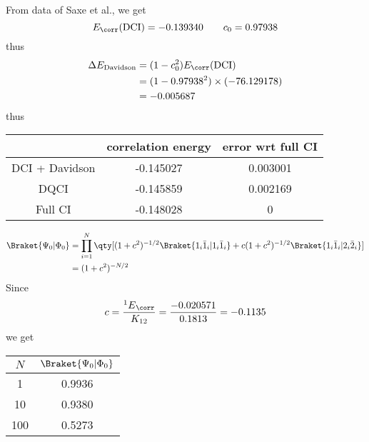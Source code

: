 \documentclass[a4paper]{article}
\begin{document}
\newpage
{}
From data of Saxe et al., we get
\begin{equation}\label{key}
E_{\corr}(\text{DCI}) = -0.139340 \qquad c_0 = 0.97938
\end{equation}
thus
\begin{align}
\Delta E_{\text{Davidson}} &= (1 - c_0^2)E_{\corr}(\text{DCI}) \notag\\
&= (1 - 0.97938^2)\times(-76.129178) \notag\\
&= -0.005687
\end{align}
thus
\begin{table}[H]
	\begin{tabular}{ccc}
		\hline
		& correlation energy & error wrt full CI \\ \hline
		DCI + Davidson & -0.145027 & 0.003001\\
		DQCI           & -0.145859 & 0.002169\\
		Full CI        & -0.148028 & 0\\ \hline
	\end{tabular}
\end{table}

\begin{align}
\Braket{\Psi_0 | \Phi_0} &= \prod_{i=1}^N \qty[(1+c^2)^{-1/2}\Braket{1_i\bar{1}_i|1_i\bar{1}_i} + c(1+c^2)^{-1/2}\Braket{1_i\bar{1}_i|2_i\bar{2}_i}] \notag\\
&= (1+c^2)^{-N/2}
\end{align}
Since 
\begin{equation}\label{key}
c = \dfrac{{^1 E}_{\corr}}{K_{12}} = \dfrac{-0.020571}{0.1813} = -0.1135
\end{equation}
we get
\begin{table}[H]
	\begin{tabular}{cc}
		\hline
		$ N $ & $ \Braket{\Psi_0 | \Phi_0} $ \\ \hline
		1 & 0.9936 \\
		10 & 0.9380 \\
		100 & 0.5273 \\ \hline
	\end{tabular}
\end{table}
\end{document}
